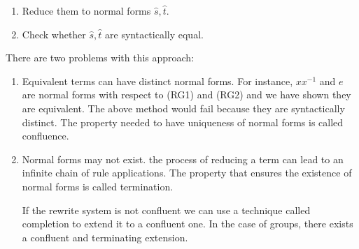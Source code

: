\begin{enumerate}
\item Reduce them to normal forms $\hat s, \hat t$.
\item Check whether $\hat s, \hat t$ are syntactically equal.
\end{enumerate}

There are two problems with this approach:

\begin{enumerate}
\item Equivalent terms can have distinct normal forms. For instance, $xx^{-1}$ and $e$ are normal forms with respect to (RG1) and (RG2) and we have shown they are equivalent. The above method would fail because they are syntactically distinct. The property needed to have uniqueness of normal forms is called confluence. 

\item Normal forms may not exist. the process of reducing a term can lead to an infinite chain of rule applications. The property that ensures the existence of normal forms is called termination. 

If the rewrite system is not confluent we can use a technique called completion to extend it to a confluent one. In the case of groups, there exists a confluent and terminating extension.
\end{enumerate}